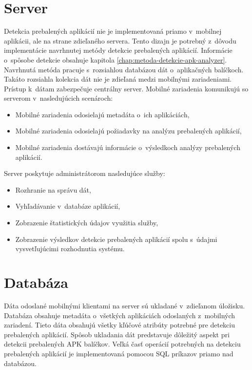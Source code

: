 \section{Server}
Detekcia prebalených aplikácií nie je implementovaná priamo v~mobilnej aplikácii, ale na strane zdieľaného servera. Tento dizajn je potrebný z~dôvodu implementácie navrhnutej metódy detekcie prebalených aplikácií. Informácie o~spôsobe detekcie obsahuje kapitola \ref{chap:metoda-detekcie-apk-analyzer}. Navrhnutá metóda pracuje s~rozsiahlou databázou dát o~aplikačných balíčkoch. Takáto rozsiahla kolekcia dát nie je zdieľaná medzi mobilnými zariadeniami. Prístup k~dátam zabezpečuje centrálny server. 
\newline
\noindent Mobilné zariadenia komunikujú so serverom v~nasledujúcich scenároch:
\begin{itemize}
	\item Mobilné zariadenia odosielajú metadáta o~ich aplikáciách,
	\item Mobilné zariadenia odosielajú požiadavky na analýzu prebalených aplikácií,
	\item Mobilné zariadenia dostávajú informácie o~výsledkoch analýzy prebalených aplikácií.
\end{itemize}
Server poskytuje administrátorom nasledujúce služby:
\begin{itemize}
	\item Rozhranie na správu dát,
	\item Vyhľadávanie v~databáze aplikácií,
	\item Zobrazenie štatistických údajov využitia služby,
	\item Zobrazenie výsledkov detekcie prebalených aplikácií spolu s~údajmi vysvetľujúcimi rozhodnutia systému.
\end{itemize}

\section{Databáza}
Dáta odoslané mobilnými klientami na server sú ukladané v~zdieľanom úložisku. Databáza obsahuje metadáta o~všetkých aplikáciách odoslaných z~mobilných zariadení. Tieto dáta obsahujú všetky kľúčové atribúty potrebné pre detekciu prebalených aplikácií. Spôsob ukladania dát predstavuje dôležitý aspekt pri detekcii prebalených APK balíčkov. Veľká časť operácií potrebných na detekciu prebalených aplikácií je implementovaná pomocou SQL príkazov priamo nad databázou. 